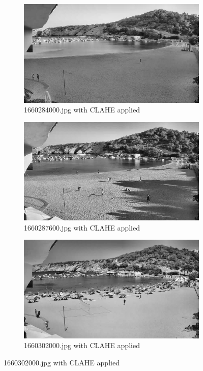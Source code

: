 \documentclass[10pt]{article}
\begin{document}
\begin{figure}[h]
  \centering %
  \begin{subfigure}{0.25\textwidth}
    \includegraphics[width=\linewidth]{img/equ/1660284000.jpg}
    \caption{1660284000.jpg with CLAHE applied}
    \label{fig:1}
  \end{subfigure}\hfil %
  \begin{subfigure}{0.25\textwidth}
    \includegraphics[width=\linewidth]{img/equ/1660287600.jpg}
    \caption{1660287600.jpg with CLAHE applied}
    \label{fig:2}
  \end{subfigure}\hfil %
  \begin{subfigure}{0.25\textwidth}
    \includegraphics[width=\linewidth]{img/equ/1660302000.jpg}
    \caption{1660302000.jpg with CLAHE applied}
    \label{fig:3}
  \end{subfigure}


\end{figure}
\end{document}
